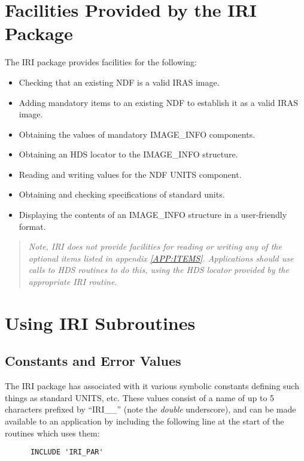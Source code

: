\section{Facilities Provided by the IRI Package}
The IRI package provides facilities for the following:
\begin{itemize}
\item Checking that an existing NDF is a valid IRAS image.
\item Adding mandatory items to an existing NDF to establish it as a valid 
IRAS image.
\item Obtaining the values of mandatory IMAGE\_INFO components.
\item Obtaining an HDS locator to the IMAGE\_INFO structure.
\item Reading and writing values for the NDF UNITS component.
\item Obtaining and checking specifications of standard units.
\item Displaying the contents of an IMAGE\_INFO structure in a user-friendly 
format.
\end{itemize}

\begin{quote}
\begin{center}
{\em
Note, IRI {\em does not} provide facilities for reading or writing any of the
optional items listed in appendix \ref{APP:ITEMS}. Applications should use calls
to HDS routines to do this, using the HDS locator provided by the appropriate
IRI routine. 
}
\end{center}
\end{quote}


\section{Using IRI Subroutines}

\subsection {Constants and Error Values}
\label {SEC:CON}
The IRI package has associated with it various symbolic constants defining such
things as standard UNITS, etc. These values consist of a name of up to 5
characters prefixed by ``IRI\_\_''  (note the {\em double} underscore), and can
be made available to an application by including the following line at the
start of the routines which uses them: 

\begin{verbatim}
      INCLUDE 'IRI_PAR'
\end{verbatim}

